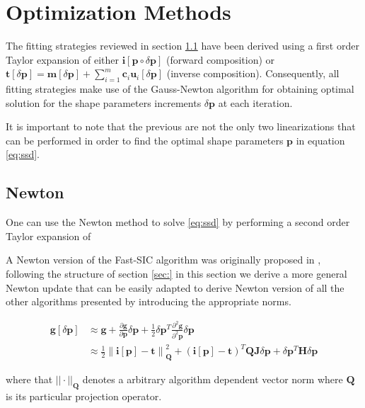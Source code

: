\section{Optimization Methods}
\label{sec:opt}

The fitting strategies reviewed in section \ref{} have been derived using a first order Taylor expansion of either $\mathbf{i}[\mathbf{p} \circ \delta \mathbf{p}]$ (forward composition) or $\mathbf{t}[\delta \mathbf{p}] = \mathbf{m}[\delta \mathbf{p}] + \sum_{i=1}^m \mathbf{c}_i \mathbf{u}_i[\delta \mathbf{p}]$ (inverse composition). Consequently, all fitting strategies make use of the Gauss-Newton algorithm for obtaining optimal solution for the shape parameters increments $\delta \mathbf{p}$ at each iteration.

It is important to note that the previous are not the only two linearizations that can be performed in order to find the optimal shape parameters $\mathbf{p}$ in equation \ref{eq:ssd}. 

\subsection{Newton}

One can use the Newton method to solve \ref{eq:ssd} by performing a second order Taylor expansion of 

A Newton version of the Fast-SIC algorithm was originally proposed in \cite{}, following the structure of section \ref{sec:} in this section we derive a more general Newton update that can be easily adapted to derive Newton version of all the other algorithms presented by introducing the appropriate norms.  

\begin{equation}
	\begin{aligned}
		\mathbf{g}[\delta \mathbf{p}] & \approx  \mathbf{g} + \frac{\partial \mathbf{g}}{\partial \mathbf{p}} \delta \mathbf{p} + 
		\frac{1}{2}\delta \mathbf{p}^T \frac{\partial^2 \mathbf{g}}{\partial^2 \mathbf{p}} \delta \mathbf{p} 
		\\
		& \approx \frac{1}{2} \left\| \mathbf{i}[\mathbf{p}] - \mathbf{t} \right\|_{\mathbf{Q}}^2 + 
		\left( \mathbf{i}[\mathbf{p}] - \mathbf{t} \right)^T \mathbf{Q} \mathbf{J} \delta \mathbf{p} + 
	\delta \mathbf{p}^T \mathbf{H} \delta \mathbf{p}
	\end{aligned}
\end{equation}

where that $|| \cdot ||_{\mathbf{Q}}$ denotes a arbitrary algorithm dependent vector norm where $\mathbf{Q}$ is its particular projection operator.

